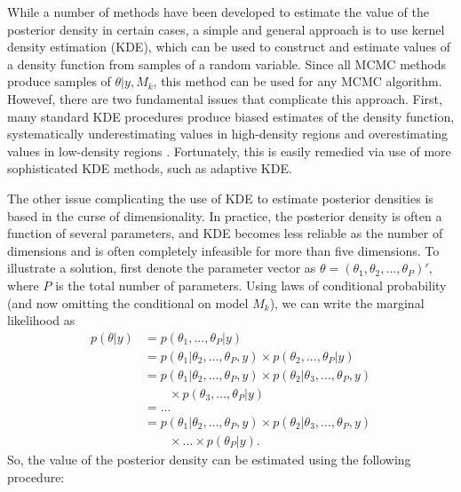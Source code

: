 \documentclass[twocolumn]{article}
\begin{document}
While a number of methods have been developed to estimate the value of the posterior density in certain cases, a simple and general approach is to use kernel density estimation (KDE), which can be used to construct and estimate values of a density function from samples of a random variable. Since all MCMC methods produce samples of $\theta|y, M_k$, this method can be used for any MCMC algorithm. Howevef, there are two fundamental issues that complicate this approach. First, many standard KDE procedures produce biased estimates of the density function, systematically underestimating values in high-density regions and overestimating values in low-density regions \citep{SilvermanDE}. Fortunately, this is easily remedied via use of more sophisticated KDE methods, such as adaptive KDE.

The other issue complicating the use of KDE to estimate posterior densities is based in the curse of dimensionality. In practice, the posterior density is often a function of several parameters, and KDE becomes less reliable as the number of dimensions and is often completely infeasible for more than five dimensions. To illustrate a solution, first denote the parameter vector as $\theta = (\theta_1, \theta_2, ..., \theta_P)',$ where $P$ is the total number of parameters. Using laws of conditional probability (and now omitting the conditional on model $M_k$), we can write the marginal likelihood as
\begin{subequations}
\begin{align}
	p(\theta|y)
	&= p(\theta_1, ..., \theta_P|y) \\
	&= p(\theta_1|\theta_2, ..., \theta_P, y)\times p(\theta_2, ..., \theta_P|y) \\
	&= p(\theta_1|\theta_2, ..., \theta_P, y)\times p(\theta_2|\theta_3, ..., \theta_P, y) \\ &\qquad\times p(\theta_3, ..., \theta_P|y) \\
	&= ... \\
	&= p(\theta_1|\theta_2, ..., \theta_P, y)\times p(\theta_2|\theta_3, ..., \theta_P, y)\\ &\qquad\times ...\times p(\theta_P|y).
\end{align}
\end{subequations}
So, the value of the posterior density can be estimated using the following procedure:
\end{document}
